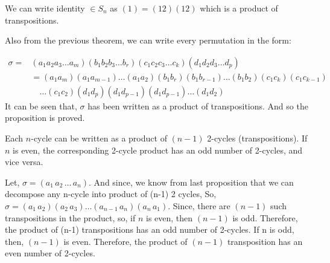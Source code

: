 \begin{proofcustom}
    We can write identity $\in S_n$ as $(1)=(12)(12)$ which is a product of transpositions.

    Also from the previous theorem, we can write every permutation in the form:
 
\begin{align*}
\sigma = &(a_1a_2a_3\dots a_m)(b_1b_2b_3\dots b_r)(c_1c_2c_3\dots c_k)(d_1d_2d_3\dots d_p) \\
&= (a_1a_m)(a_1a_{m-1})\dots(a_1a_2)(b_1b_r)(b_1b_{r-1})\dots(b_1b_2)(c_1c_k)(c_1c_{k-1}) \\
&\quad\dots(c_1c_2)(d_1d_p)(d_1d_{p-1})(d_1d_{p-1})\dots(d_1d_2)
\end{align*}
 It can be seen that, $\sigma$ has been written as a product of transpositions. And so the proposition is proved. 


\end{proofcustom}

\begin{corollary}
    Each $n$-cycle can be written as a product of $(n-1)$ 2-cycles (transpositions). If $n$ is even, the corresponding 2-cycle product has an odd number of 2-cycles, and vice versa.
\end{corollary}

\begin{proofcustom}
    Let, $\sigma= (a_1 \, a_2 \, \ldots \, a_n)$. And since, we know from last proposition that we can decompose any n-cycle into product of (n-1) 2 cycles, So, $\sigma = (a_1 \, a_2)(a_2 \, a_3) \ldots (a_{n-1} \, a_n)(a_n \, a_1)$. Since, there are $(n-1)$ such transpositions in the product, so,
if  $n$ is even, then $(n-1)$ is odd. Therefore, the product of (n-1) transpositions has an odd number of 2-cycles.
If n is odd, then, $(n-1)$ is even. Therefore, the product of $( n-1)$ transposition has an even number of 2-cycles.
\end{proofcustom}